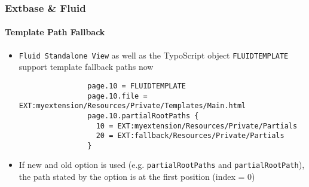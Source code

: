 %

\begin{frame}[fragile]
	\frametitle{Extbase \& Fluid}
	\framesubtitle{Template Path Fallback}

	\lstset{
		basicstyle=\tiny\ttfamily
	}

	\begin{itemize}
		\item \texttt{Fluid Standalone View} as well as the TypoScript object \texttt{FLUIDTEMPLATE} support template fallback paths now

			\begin{lstlisting}
				page.10 = FLUIDTEMPLATE
				page.10.file = EXT:myextension/Resources/Private/Templates/Main.html
				page.10.partialRootPaths {
				  10 = EXT:myextension/Resources/Private/Partials
				  20 = EXT:fallback/Resources/Private/Partials
				}
			\end{lstlisting}

		\item If new and old option is used (e.g. \texttt{partialRootPaths} and \texttt{partialRootPath}),
			the path stated by the option is at the first position (index = 0)

	\end{itemize}

\end{frame}


